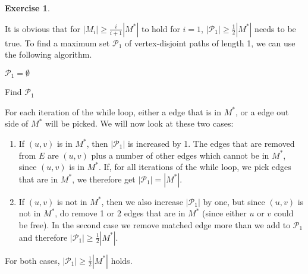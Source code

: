 \documentclass[a4paper,12pt,headsepline]{scrartcl}
\newtheorem{aufgabe}{Exercise}
\begin{document}
\newpage
\begin{aufgabe}
\end{aufgabe}

It is obvious that for $|M_i|\ge \frac{i}{i+1}|M^*|$ to hold for $i=1$, $|\mathcal P_1|\ge \frac 12 |M^*|$ needs to be true.
To find a maximum set $\mathcal P_1$ of vertex-disjoint paths of length 1, we can use the following algorithm.

\begin{algorithm}[H]
\SetAlgoLined
{}
$\mathcal P_1=\emptyset$\;
\caption{Find $\mathcal P_1$}
\end{algorithm}

For each iteration of the while loop, either a edge that is in $M^*$, or a edge out side of $M^*$ will be picked.
We will now look at these two cases:
\begin{enumerate}
 \item If $(u,v)$ is in $M^*$, then $|\mathcal P_1|$ is increased by 1.
     The edges that are removed from $E$ are $(u,v)$ plus a number of other edges which cannot be in $M^*$, since $(u,v)$ is in $M^*$.
     If, for all iterations of the while loop, we pick edges that are in $M^*$, we therefore get $|\mathcal P_1|=|M^*|$.
 \item If $(u,v)$ is not in $M^*$, then we also increase $|\mathcal P_1|$ by one, but since $(u,v)$ is not in $M^*$, do remove 1 or 2 edges that are in $M^*$ (since either $u$ or $v$ could be free).
     In the second case we remove matched edge more than we add to $\mathcal P_1$ and therefore $|\mathcal P_1|\ge \frac 12 |M^*|$.
\end{enumerate}
For both cases, $|\mathcal P_1|\ge \frac 12 |M^*|$ holds.


\end{document}
